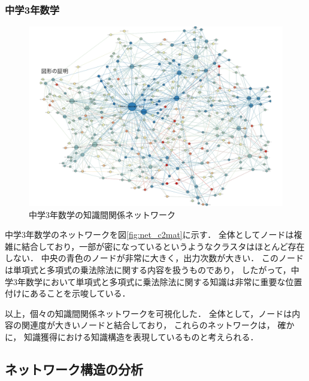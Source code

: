 \subsubsection{中学3年数学}
\begin{figure}[!htb]
\begin{center}
	\includegraphics[width=330pt]{./img/c3_mat_label2.pdf}
	\caption{中学3年数学の知識間関係ネットワーク}
	\label{fig:net_c3mat}
\end{center}
\end{figure}
中学3年数学のネットワークを図\ref{fig:net_c2mat}に示す．
全体としてノードは複雑に結合しており，一部が密になっているというようなクラスタはほとんど存在しない．
中央の青色のノードが非常に大きく，出力次数が大きい．
このノードは単項式と多項式の乗法除法に関する内容を扱うものであり，
したがって，中学3年数学において単項式と多項式に乗法除法に関する知識は非常に重要な位置付けにあることを示唆している．



以上，個々の知識間関係ネットワークを可視化した．
全体として，ノードは内容の関連度が大きいノードと結合しており，
これらのネットワークは，
確かに，
知識獲得における知識構造を表現しているものと考えられる．


\subsection{ネットワーク構造の分析}

